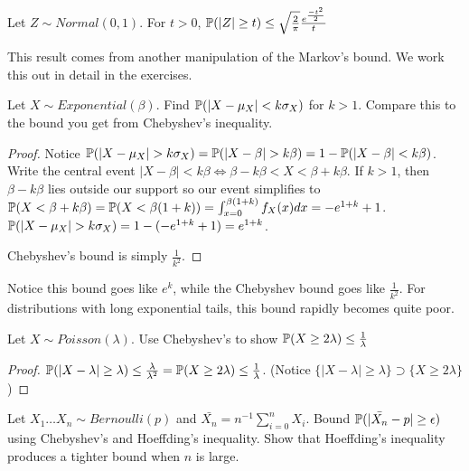 \documentclass[10pt]{article}
\begin{document}
\begin{definition}
    Let $Z \sim Normal(0, 1)$. For $t > 0$, $\P(|Z| \geq t) \leq
    \sqrt{\frac{2}{\pi}} \frac{e^{\frac{-t^2}{2}}}{t}$
\end{definition}

This result comes from another manipulation of the Markov's bound. We work this
out in detail in the exercises.

\begin{exercise}
Let $X \sim Exponential(\beta)$. Find $\P(|X - \mu_X| < k\sigma_X)$ for $k >
1$. Compare this to the bound you get from Chebyshev's inequality.
\end{exercise}

\begin{proof}
    Notice $\P(|X - \mu_X| > k\sigma_X) = \P(|X - \beta| > k\beta) = 1 - \P(|X - \beta| < k\beta)$. Write the
    central event $|X - \beta| < k\beta \iff \beta - k\beta < X < \beta +
    k\beta$. If $k > 1$, then $\beta - k\beta$ lies outside our support so our
    event simplifies to $\P(X < \beta + k\beta) = \P(X < \beta(1 + k)) =
    \int_{x=0}^{\beta (1+k)} f_X(x) dx = -e^{1+k} + 1$. $\P(|X - \mu_X| >
    k\sigma_X) = 1 - (-e^{1+k} + 1) = e^{1+k}$.

    Chebyshev's bound is simply $\frac{1}{k^2}$.
\end{proof}

\begin{note}
Notice this bound goes like $e^{k}$, while the Chebyshev bound goes like
$\frac{1}{k^2}$. For distributions with long exponential tails, this bound
rapidly becomes quite poor.
\end{note}

\begin{exercise}
    Let $X \sim Poisson(\lambda)$. Use Chebyshev's to show $\P(X \geq 2\lambda)
    \leq \frac{1}{\lambda}$
\end{exercise}

\begin{proof}
    $\P(|X - \lambda| \geq \lambda) \leq \frac{\lambda}{\lambda^2} = \P(X \geq
    2\lambda) \leq \frac{1}{\lambda}$. (Notice $\{ |X - \lambda | \geq \lambda \}
    \supset \{ X \geq 2\lambda \}$)
\end{proof}

\begin{exercise}
    Let $X_1 \dots X_n \sim Bernoulli(p)$ and $\bar{X_n} =
    n^{-1}\sum_{i=0}^{n}X_i$. Bound $\P(|\bar{X_n} - p| \geq \epsilon)$ using
    Chebyshev's and Hoeffding's inequality. Show that Hoeffding's inequality
    produces a tighter bound when $n$ is large.
\end{exercise}
\end{document}
